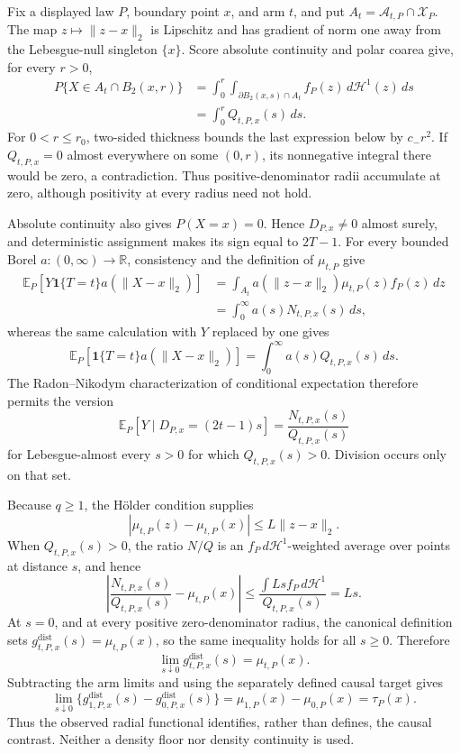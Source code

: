 Fix a displayed law \(P\), boundary point \(x\), and arm \(t\), and put \(A_t=\mathcal A_{t,P}\cap\mathcal X_P\).  The map \(z\mapsto\lVert z-x\rVert_2\) is Lipschitz and has gradient of norm one away from the Lebesgue-null singleton \(\{x\}\).  Score absolute continuity and polar coarea give, for every \(r>0\),
\[
\begin{aligned}
 P\{X\in A_t\cap B_2(x,r)\}
 &=\int_0^r\int_{\partial B_2(x,s)\cap A_t}
 f_P(z)\,d\mathcal H^1(z)\,ds\\
 &=\int_0^rQ_{t,P,x}(s)\,ds.
\end{aligned}
\]
For \(0<r\leq r_0\), two-sided thickness bounds the last expression below by \(c_-r^2\).  If \(Q_{t,P,x}=0\) almost everywhere on some \((0,r)\), its nonnegative integral there would be zero, a contradiction.  Thus positive-denominator radii accumulate at zero, although positivity at every radius need not hold.

Absolute continuity also gives \(P(X=x)=0\).  Hence \(D_{P,x}\neq0\) almost surely, and deterministic assignment makes its sign equal to \(2T-1\).  For every bounded Borel \(a:(0,\infty)\to\mathbb R\), consistency and the definition of \(\mu_{t,P}\) give
\[
\begin{aligned}
 \mathbb E_P\!\left[Y\mathbf1\{T=t\}a(\lVert X-x\rVert_2)\right]
 &=\int_{A_t}a(\lVert z-x\rVert_2)\mu_{t,P}(z)f_P(z)\,dz\\
 &=\int_0^\infty a(s)N_{t,P,x}(s)\,ds,
\end{aligned}
\]
whereas the same calculation with \(Y\) replaced by one gives
\[
 \mathbb E_P\!\left[\mathbf1\{T=t\}a(\lVert X-x\rVert_2)\right]
 =\int_0^\infty a(s)Q_{t,P,x}(s)\,ds.
\]
The Radon--Nikodym characterization of conditional expectation therefore permits the version
\[
 \mathbb E_P[Y\mid D_{P,x}=(2t-1)s]
 =\frac{N_{t,P,x}(s)}{Q_{t,P,x}(s)}
\]
for Lebesgue-almost every \(s>0\) for which \(Q_{t,P,x}(s)>0\).  Division occurs only on that set.

Because \(q\geq1\), the H\"older condition supplies
\[
 |\mu_{t,P}(z)-\mu_{t,P}(x)|\leq L\lVert z-x\rVert_2.
\]
When \(Q_{t,P,x}(s)>0\), the ratio \(N/Q\) is an \(f_P\,d\mathcal H^1\)-weighted average over points at distance \(s\), and hence
\[
 \left|\frac{N_{t,P,x}(s)}{Q_{t,P,x}(s)}-\mu_{t,P}(x)\right|
 \leq\frac{\int Ls f_P\,d\mathcal H^1}{Q_{t,P,x}(s)}=Ls.
\]
At \(s=0\), and at every positive zero-denominator radius, the canonical definition sets \(g^{\mathrm{dist}}_{t,P,x}(s)=\mu_{t,P}(x)\), so the same inequality holds for all \(s\geq0\).  Therefore
\[
 \lim_{s\downarrow0}g^{\mathrm{dist}}_{t,P,x}(s)=\mu_{t,P}(x).
\]
Subtracting the arm limits and using the separately defined causal target gives
\[
 \lim_{s\downarrow0}\{g^{\mathrm{dist}}_{1,P,x}(s)-g^{\mathrm{dist}}_{0,P,x}(s)\}
 =\mu_{1,P}(x)-\mu_{0,P}(x)=\tau_P(x).
\]
Thus the observed radial functional identifies, rather than defines, the causal contrast.  Neither a density floor nor density continuity is used.